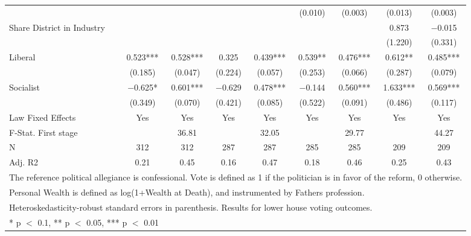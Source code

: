 \begin{table}
\begin{tabular}[t]{lcccccccc}
 &  &  &  &  & (\num{0.010}) & (\num{0.003}) & (\num{0.013}) & (\num{0.003})\\
Share District in Industry &  &  &  &  &  &  & \num{0.873} & \num{-0.015}\\
 &  &  &  &  &  &  & (\num{1.220}) & (\num{0.331})\\
Liberal & \num{0.523}*** & \num{0.528}*** & \num{0.325} & \num{0.439}*** & \num{0.539}** & \num{0.476}*** & \num{0.612}** & \num{0.485}***\\
 & (\num{0.185}) & (\num{0.047}) & (\num{0.224}) & (\num{0.057}) & (\num{0.253}) & (\num{0.066}) & (\num{0.287}) & (\num{0.079})\\
Socialist & \num{-0.625}* & \num{0.601}*** & \num{-0.629} & \num{0.478}*** & \num{-0.144} & \num{0.560}*** & \num{1.633}*** & \num{0.569}***\\
 & (\num{0.349}) & (\num{0.070}) & (\num{0.421}) & (\num{0.085}) & (\num{0.522}) & (\num{0.091}) & (\num{0.486}) & (\num{0.117})\\
\midrule
Law Fixed Effects & Yes & Yes & Yes & Yes & Yes & Yes & Yes & Yes\\
F-Stat. First stage &  & 36.81 &  & 32.05 &  & 29.77 &  & 44.27\\
N & \num{312} & \num{312} & \num{287} & \num{287} & \num{285} & \num{285} & \num{209} & \num{209}\\
Adj. R2 & \num{0.21} & \num{0.45} & \num{0.16} & \num{0.47} & \num{0.18} & \num{0.46} & \num{0.25} & \num{0.43}\\
\bottomrule
\multicolumn{9}{l}{\rule{0pt}{1em}The reference political allegiance is confessional. Vote is defined as 1 if the politician is in favor of the reform, 0 otherwise.}\\
\multicolumn{9}{l}{\rule{0pt}{1em}Personal Wealth is defined as log(1+Wealth at Death), and instrumented by Fathers profession.}\\
\multicolumn{9}{l}{\rule{0pt}{1em}Heteroskedasticity-robust standard errors in parenthesis. Results for lower house voting outcomes.}\\
\multicolumn{9}{l}{\rule{0pt}{1em}* p $<$ 0.1, ** p $<$ 0.05, *** p $<$ 0.01}\\
\end{tabular}
\end{table}
